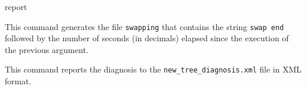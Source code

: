 \begin{command}{report}{}
\begin{poyexamples}
            {This command generates the file \texttt{swapping} that contains
            the string \texttt{swap end} followed by the number of seconds (in
            decimals) elapsed since the execution of the previous 
            argument.}
      
            {This command reports the diagnosis to the \texttt{new\_tree\_diagnosis.xml}
            file in XML format.}

    \end{poyexamples}

    \begin{poyalso}
    \end{poyalso}

\end{command}



   
